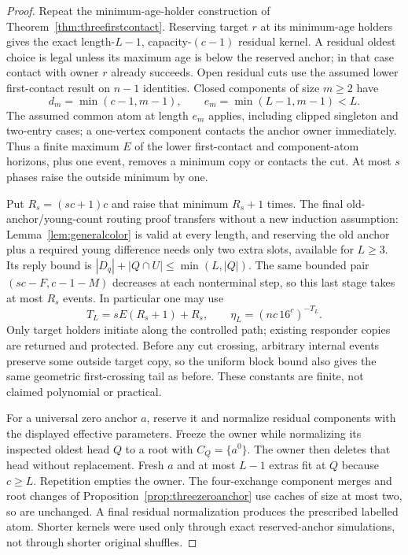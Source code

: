 \documentclass[11pt]{article}
\begin{document}
\begin{proof}
Repeat the minimum-age-holder construction of
Theorem~\ref{thm:threefirstcontact}. Reserving target $r$ at
its minimum-age holders gives the exact length-$L-1$,
capacity-$(c-1)$ residual kernel. A residual oldest choice
is legal unless its maximum age is below the reserved anchor;
in that case contact with owner $r$ already succeeds.
Open residual cuts use the assumed lower first-contact result
on $n-1$ identities. Closed components of size $m\ge2$ have
\[
 d_m=\min(c-1,m-1),\qquad e_m=\min(L-1,m-1)<L.
\]
The assumed common atom at length $e_m$ applies, including
clipped singleton and two-entry cases; a one-vertex component
contacts the anchor owner immediately. Thus a finite maximum
$E$ of the lower first-contact and component-atom horizons,
plus one event, removes a minimum copy or contacts the cut.
At most $s$ phases raise the outside minimum by one.

Put $R_s=(sc+1)c$ and raise that minimum $R_s+1$ times.
The final old-anchor/young-count routing proof transfers
without a new induction assumption: Lemma~\ref{lem:generalcolor}
is valid at every length, and reserving the old anchor plus
a required young difference needs only two extra slots,
available for $L\ge3$. Its reply bound is
$|D_q|+|Q\cap U|\le\min(L,|Q|)$. The same bounded pair
$(sc-F,c-1-M)$ decreases at each nonterminal step, so this
last stage takes at most $R_s$ events. In particular one may
use
\[
 T_L=sE(R_s+1)+R_s,\qquad
 \eta_L=(nc\,16^c)^{-T_L}.
\]
Only target holders initiate along the controlled path;
existing responder copies are returned and protected. Before
any cut crossing, arbitrary internal events preserve some
outside target copy, so the uniform block bound also gives
the same geometric first-crossing tail as before. These
constants are finite, not claimed polynomial or practical.

For a universal zero anchor $a$, reserve it and normalize
residual components with the displayed effective parameters.
Freeze the owner while normalizing its inspected oldest head
$Q$ to a root with $C_Q=\{a^0\}$. The owner then deletes that
head without replacement. Fresh $a$ and at most $L-1$ extras
fit at $Q$ because $c\ge L$. Repetition empties the owner.
The four-exchange component merges and root changes of
Proposition~\ref{prop:threezeroanchor} use caches of size at
most two, so are unchanged. A final residual normalization
produces the prescribed labelled atom. Shorter kernels were
used only through exact reserved-anchor simulations, not
through shorter original shuffles.
\end{proof}
\end{document}
